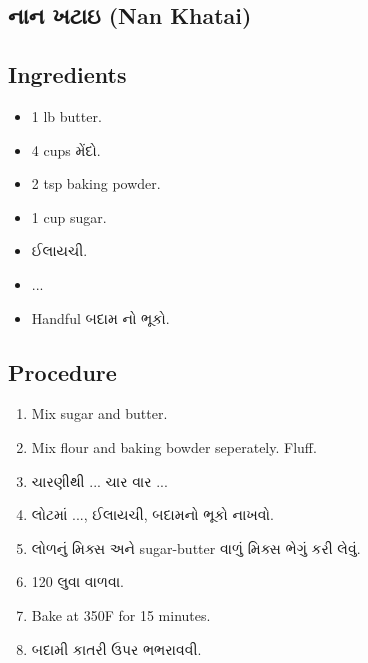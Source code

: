 \documentclass[../../recipes.tex]{subfiles}
\begin{document}
\begin{gujarati}

\chapter{નાન ખટાઇ (Nan Khatai)}

\section*{Ingredients}

\begin{itemize}
    \item 1 lb butter.
    \item 4 cups મેંદો.
    \item 2 tsp baking powder.
    \item 1 cup sugar.
    \item ઈલાયચી.
    \item ...
    \item Handful બદામ નો ભૂકો.
\end{itemize}

\noindent
\section*{Procedure}

\begin{enumerate}
    \item Mix sugar and butter.
    \item Mix flour and baking bowder seperately. Fluff.
    \item ચારણીથી ... ચાર વાર ...
    \item લોટમાં ..., ઈલાયચી, બદામનો ભૂકો નાખવો.
    \item લોળનું મિક્સ અને sugar-butter વાળું મિક્સ ભેગું કરી લેવું.
    \item 120 લુવા વાળવા.
    \item Bake at 350\textdegree F for 15 minutes.
    \item બદામી કાતરી ઉપર ભભરાવવી.
\end{enumerate}

\end{gujarati}
\end{document}
